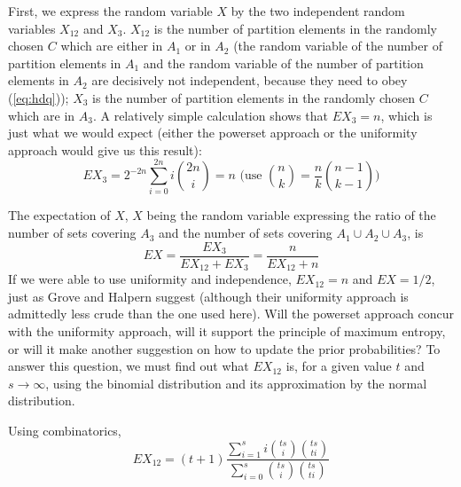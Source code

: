 \documentclass[smallextended]{svjour3}       %
\begin{document}
First, we express the random variable $X$ by the two independent
random variables $X_{12}$ and $X_{3}$. $X_{12}$ is the number of
partition elements in the randomly chosen $C$ which are either in
$A_{1}$ or in $A_{2}$ (the random variable of the number of partition
elements in $A_{1}$ and the random variable of the number of partition
elements in $A_{2}$ are decisively not independent, because they need
to obey ({\ref{eq:hdq}})); $X_{3}$ is the number of partition elements
in the randomly chosen $C$ which are in $A_{3}$. A relatively simple
calculation shows that $EX_{3}=n$, which is just what we would expect
(either the powerset approach or the uniformity approach would give us
this result):
\begin{displaymath}
  EX_{3}=2^{-2n}\sum_{i=0}^{2n}i\binom{2n}{i}=n\mbox{ (use }\binom{n}{k}=\frac{n}{k}\binom{n-1}{k-1}\mbox{)}
\end{displaymath}

The expectation of $X$, $X$ being the random variable expressing the
ratio of the number of sets covering $A_{3}$ and the number of sets
covering $A_{1}\cup{}A_{2}\cup{}A_{3}$, is
\begin{displaymath}
  EX=\frac{EX_{3}}{EX_{12}+EX_{3}}=\frac{n}{EX_{12}+n}
\end{displaymath}
If we were able to use uniformity and independence, $EX_{12}=n$ and
$EX=1/2$, just as Grove and Halpern suggest (although their uniformity
approach is admittedly less crude than the one used here). Will the
powerset approach concur with the uniformity approach, will it support
the principle of maximum entropy, or will it make another suggestion
on how to update the prior probabilities? To answer this question, we
must find out what $EX_{12}$ is, for a given value $t$ and
$s\rightarrow\infty$, using the binomial distribution and its
approximation by the normal distribution.

Using combinatorics,
\begin{displaymath}
  EX_{12}=(t+1)\frac{\sum_{i=1}^{s}i\binom{ts}{i}\binom{ts}{ti}}{\sum_{i=0}^{s}\binom{ts}{i}\binom{ts}{ti}}
\end{displaymath}
\end{document}
